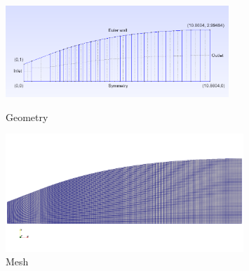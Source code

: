 \begin{figure}[H]
    \centering
    \includegraphics[width=0.75\textwidth]{text/Nozzle_Geometry.PNG}\\
    \caption[Geometry]{Geometry}
    \label{fig:Geometry}
\end{figure}
\begin{figure}[H]
    \centering
    \includegraphics[width=0.8\textwidth]{text/Nozzle_mesh_pic.png}
    \caption[Mesh]{Mesh}
    \label{fig:Mesh}
\end{figure}

